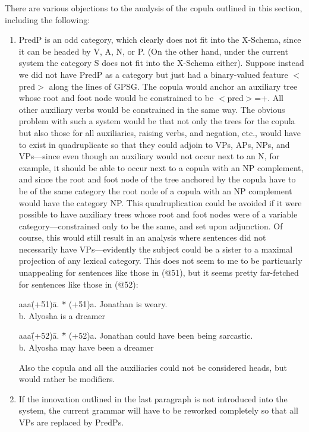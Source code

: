 There are various objections to the analysis of the copula outlined in
this section, including the following:
\begin{enumerate}

\item PredP is an odd category, which clearly does not fit into the
\={X}-Schema, since it can be headed by V, A, N, or P. (On the other
hand, under the current system the category S does not fit into the
\={X}-Schema either).  Suppose instead we did not have PredP as a
category but just had a binary-valued feature $<$pred$>$ along the lines
of GPSG. The copula would anchor an auxiliary tree whose root and foot
node would be constrained to be $<$pred$>$=+.  All other auxiliary verbs
would be constrained in the same way.  The obvious problem with such a
system would be that not only the trees for the copula but also those
for all auxiliaries, raising verbs, and negation, etc., would have to
exist in quadruplicate so that they could adjoin to VPs, APs, NPs, and
VPs---since even though an auxiliary would not occur next to an N, for
example, it should be able to occur next to a copula with an NP
complement, and since the root and foot node of the tree anchored by the
copula have to be of the same category the root node of a copula with an
NP complement would have the category NP.  This quadruplication could be
avoided if it were possible to have auxiliary trees whose root and foot
nodes were of a variable category---constrained only to be the same, and
set upon adjunction. Of course, this would still result in an analysis where
sentences did not necessarily have VPs---evidently the subject could be
a sister to a maximal projection of any lexical category. This does not
seem to me to be particuarly unappealing for sentences like those in
(@51), but it seems pretty far-fetched for sentences like those in
(@52): 
\begin{tabbing}
aaa\=(+51)\=a. \= *\= \kill
   \>(+51)\>a. \>  \> Jonathan is weary.       \\
   \>     \>b. \>  \> Alyosha is a dreamer
\end{tabbing}
\begin{tabbing}
aaa\=(+52)\=a. \= *\= \kill
   \>(+52)\>a. \>  \> Jonathan could have been being sarcastic.      \\
   \>     \>b. \>  \> Alyosha may have been a dreamer
\end{tabbing}
Also the copula and all the auxiliaries could not be considered heads,
but would rather be modifiers.

\item If the innovation outlined in the last paragraph is not introduced
into the system, the current grammar will have to be reworked completely
so that all VPs are replaced by PredPs.

\end{enumerate}

